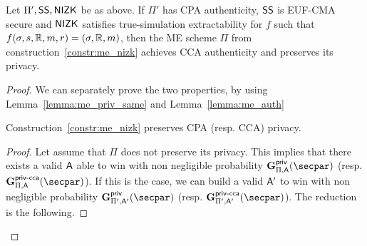 \begin{theorem}\label{theo:me_nizk_auth}
    Let $\Pi', \mathsf{SS}, \mathsf{NIZK}$ be as above.
    If $\Pi'$ has CPA authenticity, $\mathsf{SS}$ is EUF-CMA secure and $\mathsf{NIZK}$ satisfies true-simulation extractability for $f$ such that $f(\sigma, s, \mathbb{R}, m, r) = (\sigma, \mathbb{R}, m)$, then the ME scheme $\Pi$ from construction~\ref{constr:me_nizk} achieves CCA authenticity and preserves its privacy.
\end{theorem}

\begin{proof}
    We can separately prove the two properties, by using Lemma~\ref{lemma:me_priv_same} and Lemma~\ref{lemma:me_auth}

    \begin{lemma}\label{lemma:me_priv_same}
        Construction~\ref{constr:me_nizk} preserves CPA (resp. CCA) privacy.
        \begin{proof}
            Let assume that $\Pi$ does not preserve its privacy.
            This implies that there exists a valid $\mathsf{A}$ able to win with non negligible probability $\NISHmatchgame{}_{\Pi, \adversary}(\secpar)$ (resp. $\NISHmatchgamecca{}_{\Pi, \adversary}(\secpar)$).
            If this is the case, we can build a valid $\mathsf{A}'$ to win with non negligible probability $\NISHmatchgame{}_{\Pi', \adversary'}(\secpar)$ (resp. $\NISHmatchgamecca{}_{\Pi', \adversary'}(\secpar)$).
            The reduction is the following.


\end{proof}
\end{lemma}
\end{proof}
